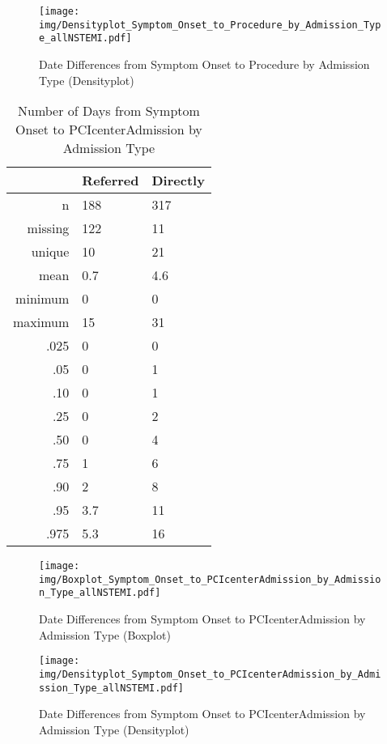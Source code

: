 \documentclass[a4paper]{report}
\begin{document}
\begin{itemize}
{\begin{figure}
  \centering
  \caption{Date Differences from Symptom Onset to Procedure by Admission Type (Densityplot)}
  \label{Density: Date Differences from Symptom Onset to Procedure by Admission Type}
\texttt{[image: img/Densityplot\_Symptom\_Onset\_to\_Procedure\_by\_Admission\_Type\_allNSTEMI.pdf]}\end{figure}


\clearpage

\begin{table}[ht]
\centering
\begin{tabular}{rll}
  \toprule
 & Referred & Directly \\ 
  \midrule
n & 188 & 317 \\ 
  missing & 122 & 11 \\ 
  unique & 10 & 21 \\ 
  mean & 0.7 & 4.6 \\ 
  minimum & 0 & 0 \\ 
  maximum & 15 & 31 \\ 
  .025 & 0 & 0 \\ 
  .05 & 0 & 1 \\ 
  .10 & 0 & 1 \\ 
  .25 & 0 & 2 \\ 
  .50 & 0 & 4 \\ 
  .75 & 1 & 6 \\ 
  .90 & 2 & 8 \\ 
  .95 & 3.7 & 11 \\ 
  .975 & 5.3 & 16 \\ 
   \bottomrule
\end{tabular}
\caption{Number of Days from Symptom Onset to PCIcenterAdmission by Admission Type} 
\end{table}
\begin{figure}
  \centering
  \caption{Date Differences from Symptom Onset to PCIcenterAdmission by Admission Type (Boxplot)}
  \label{Boxplot: Date Differences from Symptom Onset to PCIcenterAdmission by Admission Type}
\texttt{[image: img/Boxplot\_Symptom\_Onset\_to\_PCIcenterAdmission\_by\_Admission\_Type\_allNSTEMI.pdf]}\end{figure}


\begin{figure}
  \centering
  \caption{Date Differences from Symptom Onset to PCIcenterAdmission by Admission Type (Densityplot)}
  \label{Density: Date Differences from Symptom Onset to PCIcenterAdmission by Admission Type}
\texttt{[image: img/Densityplot\_Symptom\_Onset\_to\_PCIcenterAdmission\_by\_Admission\_Type\_allNSTEMI.pdf]}\end{figure}


}
\end{itemize}
\end{document}
